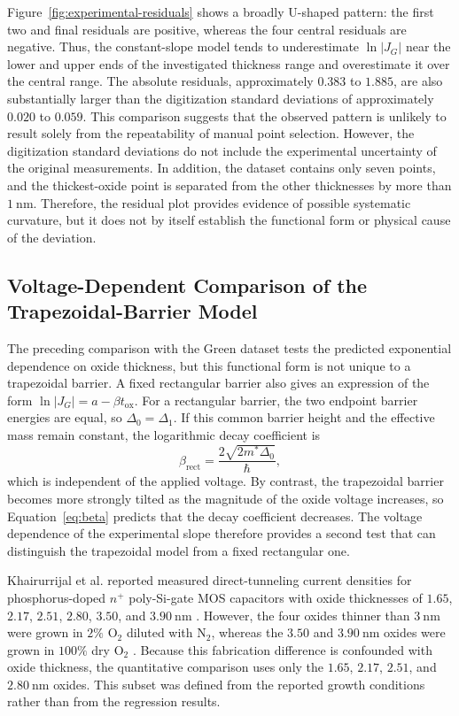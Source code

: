 \documentclass[12pt]{article}
\begin{document}
Figure~\ref{fig:experimental-residuals} shows a broadly U-shaped pattern: the first two and final residuals are positive, whereas the four central residuals are negative. Thus, the constant-slope model tends to underestimate \(\ln|J_G|\) near the lower and upper ends of the investigated thickness range and overestimate it over the central range. The absolute residuals, approximately \(0.383\) to \(1.885\), are also substantially larger than the digitization standard deviations of approximately \(0.020\) to \(0.059\). This comparison suggests that the observed pattern is unlikely to result solely from the repeatability of manual point selection. However, the digitization standard deviations do not include the experimental uncertainty of the original measurements. In addition, the dataset contains only seven points, and the thickest-oxide point is separated from the other thicknesses by more than \(1~\mathrm{nm}\). Therefore, the residual plot provides evidence of possible systematic curvature, but it does not by itself establish the functional form or physical cause of the deviation.


\subsection{Voltage-Dependent Comparison of the Trapezoidal-Barrier Model}

The preceding comparison with the Green dataset tests the predicted exponential dependence on oxide thickness, but this functional form is not unique to a trapezoidal barrier. A fixed rectangular barrier also gives an expression of the form \(\ln |J_G|=a-\beta t_{\mathrm{ox}}\). For a rectangular barrier, the two endpoint barrier energies are equal, so \(\Delta_0=\Delta_1\). If this common barrier height and the effective mass remain constant, the logarithmic decay coefficient is
\begin{equation}
    \beta_{\mathrm{rect}}
    =
    \frac{2\sqrt{2m^*\Delta_0}}{\hbar},
    \label{eq:rectangular-beta}
\end{equation}
which is independent of the applied voltage. By contrast, the trapezoidal barrier becomes more strongly tilted as the magnitude of the oxide voltage increases, so Equation~\eqref{eq:beta} predicts that the decay coefficient decreases. The voltage dependence of the experimental slope therefore provides a second test that can distinguish the trapezoidal model from a fixed rectangular one.

Khairurrijal et al. reported measured direct-tunneling current densities for phosphorus-doped \(n^+\) poly-Si-gate MOS capacitors with oxide thicknesses of \(1.65\), \(2.17\), \(2.51\), \(2.80\), \(3.50\), and \(3.90~\mathrm{nm}\) \cite{khairurrijal2000}. However, the four oxides thinner than \(3~\mathrm{nm}\) were grown in \(2\%\) O\(_2\) diluted with N\(_2\), whereas the \(3.50\) and \(3.90~\mathrm{nm}\) oxides were grown in \(100\%\) dry O\(_2\) \cite{khairurrijal2000}. Because this fabrication difference is confounded with oxide thickness, the quantitative comparison uses only the \(1.65\), \(2.17\), \(2.51\), and \(2.80~\mathrm{nm}\) oxides. This subset was defined from the reported growth conditions rather than from the regression results.
\end{document}
